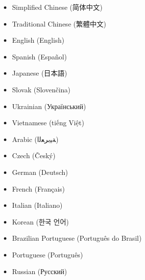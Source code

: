 \documentclass{../../public_resources/doc}
\begin{document}
\begin{itemize}
    \item Simplified Chinese (简体中文)
    \item Traditional Chinese (繁體中文)
    \item English (English)
    \item Spanish (Español)
    \item Japanese (日本語)
    \item Slovak (Slovenčina)
    \item Ukrainian (Український)
    \item Vietnamese (tiếng Việt)
    \item Arabic (ﺔﻴﺑﺮﻌﻟﺍ)
    \item Czech (Český)
    \item German (Deutsch)
    \item French (Français)
    \item Italian (Italiano)
    \item Korean (한국 언어)
    \item Brazilian Portuguese (Português do Brasil)
    \item Portuguese (Português)
    \item Russian (Русский)
\end{itemize}
\end{document}
